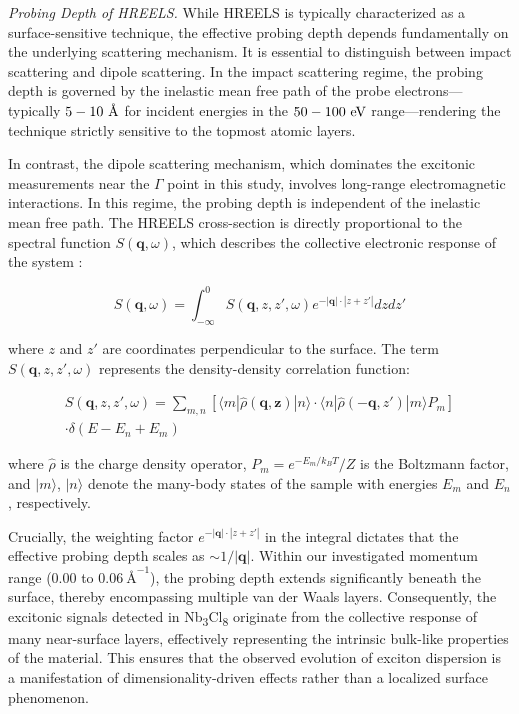 \documentclass[twocolumn,prl,showpacs,superscriptaddress,longbibliography]{revtex4-2}
\makeatletter
\newcommand{\lyxmathsym}[1]{\ifmmode\begingroup\def\b@ld{bold}
  \text{\ifx\math@version\b@ld\bfseries\fi#1}\endgroup\else#1\fi}
\makeatother
\begin{document}
\emph{Probing Depth of HREELS.} While HREELS is typically characterized
as a surface-sensitive technique, the effective probing depth depends
fundamentally on the underlying scattering mechanism. It is essential
to distinguish between impact scattering and dipole scattering. In
the impact scattering regime, the probing depth is governed by the
inelastic mean free path of the probe electrons---typically $5-10\ \lyxmathsym{\AA}$
for incident energies in the $50-100\ {\rm eV}$ range---rendering
the technique strictly sensitive to the topmost atomic layers.

In contrast, the dipole scattering mechanism, which dominates the
excitonic measurements near the $\Gamma$ point in this study, involves
long-range electromagnetic interactions. In this regime, the probing
depth is independent of the inelastic mean free path. The HREELS cross-section
is directly proportional to the spectral function $S(\boldsymbol{q},\omega)$,
which describes the collective electronic response of the system \citep{RN12}:

\[
S(\boldsymbol{q},\omega)=\int_{-\infty}^{0}S(\boldsymbol{q},z,z',\omega)e^{-|\boldsymbol{q}|\cdot|z+z'|}dzdz'
\]

\noindent where $z$ and $z'$ are coordinates perpendicular to the
surface. The term $S(\boldsymbol{q},z,z',\omega)$ represents the
density-density correlation function:

\begin{gather*}
S(\boldsymbol{q},z,z',\omega)=\sum_{m,n}\left[\langle m|\hat{\rho}(\boldsymbol{q},\boldsymbol{z})|n\rangle\cdot\langle n|\hat{\rho}(-\boldsymbol{q},z')|m\rangle P_{m}\right]\\
\cdot\delta(E-E_{n}+E_{m})
\end{gather*}

\noindent where $\hat{\rho}$ is the charge density operator, $P_{m}=e^{-E_{m}/k_{B}T}/Z$
is the Boltzmann factor, and $|m\rangle$, $|n\rangle$ denote the
many-body states of the sample with energies $E_{m}$ and $E_{n}$,
respectively.

Crucially, the weighting factor $e^{-|\boldsymbol{q}|\cdot|z+z'|}$
in the integral dictates that the effective probing depth scales as
$\sim1/|\boldsymbol{q}|$. Within our investigated momentum range
($0.00$ to $0.06\ \text{\AA}^{-1}$), the probing depth extends significantly
beneath the surface, thereby encompassing multiple van der Waals layers.
Consequently, the excitonic signals detected in Nb\textsubscript{3}Cl\textsubscript{8}
originate from the collective response of many near-surface layers,
effectively representing the intrinsic bulk-like properties of the
material. This ensures that the observed evolution of exciton dispersion
is a manifestation of dimensionality-driven effects rather than a
localized surface phenomenon.
\end{document}
